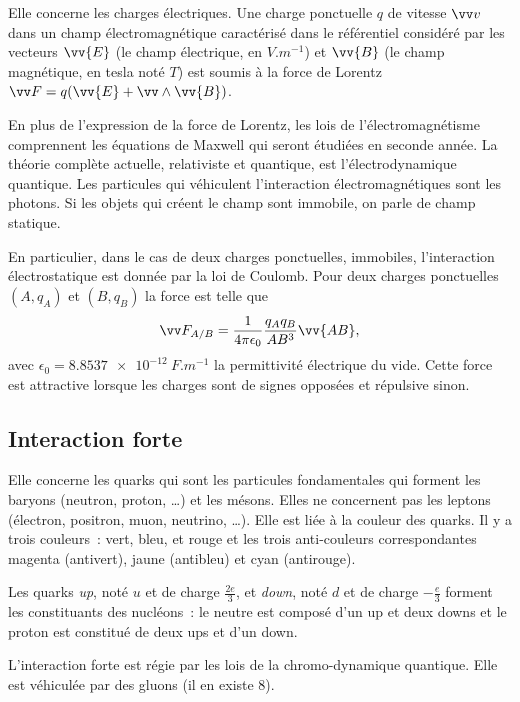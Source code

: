 Elle concerne les charges électriques. Une charge ponctuelle $q$ de vitesse $\vvv$ dans un champ électromagnétique caractérisé dans le référentiel considéré par les vecteurs $\vv{E}$ (le champ électrique, en $\si{V.m^{-1}}$) et $\vv{B}$ (le champ magnétique, en tesla noté $\si{T}$) est soumis à la force de Lorentz $\vF = q(\vv{E}+\vv \wedge \vv{B})$.

En plus de l'expression de la force de Lorentz, les lois de l'électromagnétisme comprennent les équations de Maxwell qui seront étudiées en seconde année. La théorie complète actuelle, relativiste et quantique, est l'électrodynamique quantique. Les particules qui véhiculent l'interaction électromagnétiques sont les photons. Si les objets qui créent le champ sont immobile, on parle de champ statique.

En particulier, dans le cas de deux charges ponctuelles, immobiles, l'interaction électrostatique est donnée par la loi de Coulomb. Pour deux charges ponctuelles $(A, q_A)$ et $(B, q_B)$ la force est telle que
\begin{equation}
  \vF_{A/B} = \frac{1}{4\pi \epsilon_0} \frac{q_A q_B}{AB^3} \vv{AB},
\end{equation}
avec $\epsilon_0 = \SI{8,8537e-12}{F.m^{-1}}$ la permittivité électrique du vide. Cette force est attractive lorsque les charges sont de signes opposées et répulsive sinon.

\subsection{Interaction forte}
\label{chap2-subsec:interactionforte}

Elle concerne les quarks qui sont les particules fondamentales qui forment les baryons (neutron, proton, \ldots) et les mésons. Elles ne concernent pas les leptons (électron, positron, muon, neutrino, \ldots). Elle est liée à la couleur des quarks. Il y a trois couleurs~: vert, bleu, et rouge et les trois anti-couleurs correspondantes magenta (antivert), jaune (antibleu) et cyan (antirouge).

Les quarks \emph{up}, noté $u$ et de charge $\frac{2e}{3}$, et \emph{down}, noté $d$ et de charge $-\frac{e}{3}$ forment les constituants des nucléons~: le neutre est composé d'un up et deux downs et le proton est constitué de deux ups et d'un down.

L'interaction forte est régie par les lois de la chromo-dynamique quantique. Elle est véhiculée par des gluons (il en existe 8).


